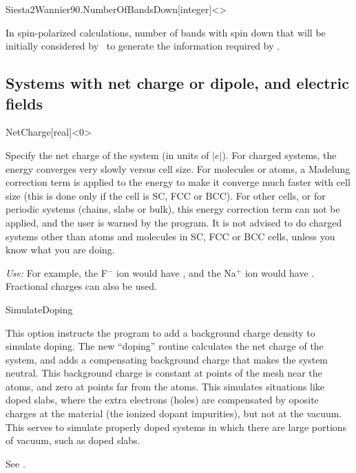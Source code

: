\begin{fdfentry}{Siesta2Wannier90.NumberOfBandsDown}[integer]<>

  In spin-polarized calculations, number of bands with spin down that
  will be initially considered by \siesta\ to generate the information
  required by .

\end{fdfentry}



\subsection{Systems with net charge or dipole, and electric fields}

\begin{fdfentry}{NetCharge}[real]<$0$>%

  Specify the net charge of the system (in units of $|e|$).  For
  charged systems, the energy converges very slowly versus cell
  size. For molecules or atoms, a Madelung correction term is applied
  to the energy to make it converge much faster with cell size (this
  is done only if the cell is SC, FCC or BCC). For other cells, or for
  periodic systems (chains, slabs or bulk), this energy correction
  term can not be applied, and the user is warned by the program. It
  is not advised to do charged systems other than atoms and molecules
  in SC, FCC or BCC cells, unless you know what you are doing.

  \textit{Use:} For example, the F$^-$ ion would have 
   , and the Na$^+$ ion would have  .
  Fractional charges can also be used.
  
\end{fdfentry}


\begin{fdflogicalF}{SimulateDoping}

  This option instructs the program to add a background charge density
  to simulate doping.  The new ``doping'' routine calculates the net
  charge of the system, and adds a compensating background charge that
  makes the system neutral. This background charge is constant at
  points of the mesh near the atoms, and zero at points far from the
  atoms.  This simulates situations like doped slabs, where the extra
  electrons (holes) are compensated by oposite charges at the material
  (the ionized dopant impurities), but not at the vacuum.  This serves
  to simulate properly doped systems in which there are large portions
  of vacuum, such as doped slabs.

  See .

\end{fdflogicalF}

